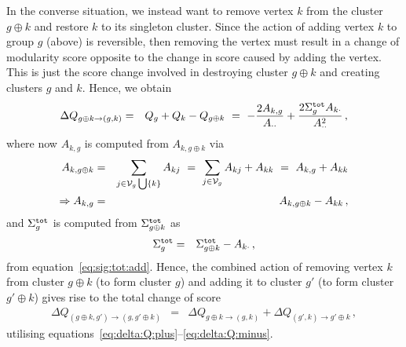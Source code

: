 \documentclass[a4paper]{article}
\begin{document}
In the converse situation, we instead want to remove vertex $k$ from the cluster $g\oplus k$
 and restore $k$ to its singleton cluster. Since the
action of adding vertex $k$ to group $g$ (above) is reversible, then removing the vertex must result in a change of 
modularity score opposite to the change in score caused by adding the vertex.
This is just the score change involved in destroying cluster $g\oplus k$ and creating clusters $g$ and $k$.
 Hence, we obtain
\begin{eqnarray}
    \Delta Q_{g\oplus k\rightarrow(g,k)} & = & Q_g+Q_k-Q_{g\oplus k}
~=~    -\frac{2A_{k,g}}{A_{\cdot\cdot}}+\frac{2\Sigma_g^{\tt tot}A_{k\cdot}}{A_{\cdot\cdot}^2}\,,
\label{eq:delta:Q:minus}
\end{eqnarray}
where now $A_{k,g}$ is computed from $A_{k,g\oplus k}$ via
\begin{eqnarray}
    A_{k,g\oplus k} & = & \sum_{j\in{\cal V}_g\bigcup\{k\}}A_{kj}
    ~=~\sum_{j\in{\cal V}_g}A_{kj}+A_{kk}~=~A_{k,g}+A_{kk}
\nonumber\\
\Rightarrow A_{k,g} & = & A_{k,g\oplus k} - A_{kk}\,,
\end{eqnarray}
and $\Sigma_g^{\tt tot}$ is computed from $\Sigma_{g\oplus k}^{\tt tot}$ as
\begin{eqnarray}
    \Sigma_{g}^{\tt tot} & = & \Sigma_{g\oplus k}^{\tt tot}-A_{k\cdot}\,,
\end{eqnarray}
from equation~\eqref{eq:sig:tot:add}.
Hence, the combined action of removing vertex $k$ from cluster $g\oplus k$ (to form cluster $g$)
and adding it to cluster $g'$ (to form cluster $g'\oplus k$) gives rise to the total change of score
\begin{eqnarray}
    \Delta Q_{(g\oplus k,g')\rightarrow(g,g'\oplus k)} & = & \Delta Q_{g\oplus k\rightarrow(g,k)} + 
    \Delta Q_{(g',k)\rightarrow g'\oplus k}\,,
\end{eqnarray}
utilising equations~\eqref{eq:delta:Q:plus}--\eqref{eq:delta:Q:minus}.
\end{document}
